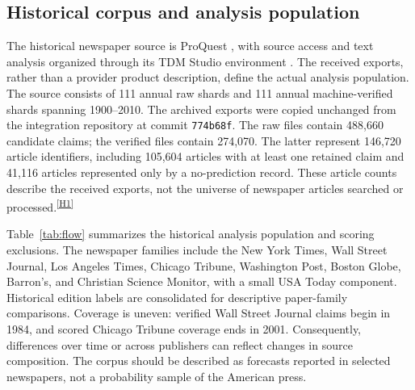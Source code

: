 \documentclass[iicol,pdflatex,sn-mathphys-num]{sn-jnl}
\newcommand{\evidence}[1]{\textsuperscript{\hyperref[app:evidence]{[#1]}}}
\begin{document}
\subsection{Historical corpus and analysis population}
The historical newspaper source is ProQuest \citep{proquesthistorical}, with source access and text analysis organized through its TDM Studio environment \citep{proquesttdm}. The received exports, rather than a provider product description, define the actual analysis population. The source consists of 111 annual raw shards and 111 annual machine-verified shards spanning 1900--2010. The archived exports were copied unchanged from the integration repository at commit \texttt{774b68f}. The raw files contain 488,660 candidate claims; the verified files contain 274,070. The latter represent 146,720 article identifiers, including 105,604 articles with at least one retained claim and 41,116 articles represented only by a no-prediction record. These article counts describe the received exports, not the universe of newspaper articles searched or processed.\evidence{H1}

Table~\ref{tab:flow} summarizes the historical analysis population and scoring exclusions. The newspaper families include the New York Times, Wall Street Journal, Los Angeles Times, Chicago Tribune, Washington Post, Boston Globe, Barron's, and Christian Science Monitor, with a small USA Today component. Historical edition labels are consolidated for descriptive paper-family comparisons. Coverage is uneven: verified Wall Street Journal claims begin in 1984, and scored Chicago Tribune coverage ends in 2001. Consequently, differences over time or across publishers can reflect changes in source composition. The corpus should be described as forecasts reported in selected newspapers, not a probability sample of the American press.
\end{document}
